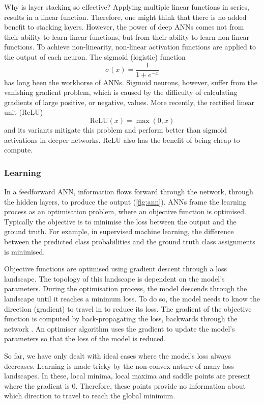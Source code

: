 Why is layer stacking so effective? Applying multiple linear functions in series, results in a linear function. Therefore, one might think that there is no added benefit to stacking layers. However, the power of deep ANNs comes not from their ability to learn linear functions, but from their ability to learn non-linear functions. To achieve non-linearity, non-linear activation functions are applied to the output of each neuron. The sigmoid (logistic) function
\[
\sigma(x) = \frac{1}{1+e^{-x}}
\]
has long been the workhorse of ANNs. Sigmoid neurons, however, suffer from the vanishing gradient problem, which is caused by the difficulty of calculating gradients of large positive, or negative, values. More recently, the rectified linear unit (ReLU)
\[
\text{ReLU}(x) = \max(0,x)
\]
and its variants mitigate this problem and perform better than sigmoid activations in deeper networks. ReLU also has the benefit of being cheap to compute.

\subsubsection{Learning}

In a feedforward ANN, information flows forward through the network, through the hidden layers, to produce the output (\ref{fig:ann}). ANNs frame the learning process as an optimisation problem, where an objective function is optimised. Typically the objective is to minimise the loss between the output and the ground truth. For example, in supervised machine learning, the difference between the predicted class probabilities and the ground truth class assignments is minimised.

Objective functions are optimised using gradient descent through a loss landscape. The topology of this landscape is dependent on the model's parameters. During the optimisation process, the model descends through the landscape until it reaches a minimum loss. To do so, the model needs to know the direction (gradient) to travel in to reduce its loss. The gradient of the objective function is computed by back-propagating the loss, backwards through the network \cite{Rumelhart1986}. An optimiser algorithm uses the gradient to update the model's parameters so that the loss of the model is reduced.

So far, we have only dealt with ideal cases where the model's loss always decreases. Learning is made tricky by the non-convex nature of many loss landscapes. In these, local minima, local maxima and saddle points are present where the gradient is $0$. Therefore, these points provide no information about which direction to travel to reach the global minimum.

